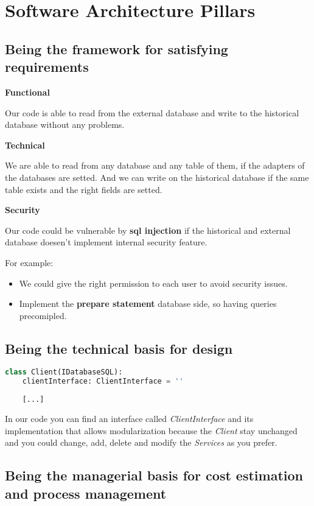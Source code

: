 \section{Software Architecture Pillars}

\subsection{Being the framework for satisfying requirements}

\textbf{Functional}

Our code is able to read from the external database and write to the historical database without any problems.

\textbf{Technical}

We are able to read from any database and any table of them, if the adapters of the databases are setted. And we can write on the historical database if the same table exists and the right fields are setted.

\textbf{Security}

Our code could be vulnerable by \textbf{sql injection} if the historical and external database doesen't implement internal security feature.

For example:
\begin{itemize}
	\item We could give the right permission to each user to avoid security issues.
	\item Implement the \textbf{prepare statement} database side, so having queries precomipled.
\end{itemize}

\subsection{Being the technical basis for design}

\begin{lstlisting}[language=Python]
class Client(IDatabaseSQL): 
	clientInterface: ClientInterface = ''
	
	[...]
\end{lstlisting}

In our code you can find an interface called \textit{ClientInterface} and its implementation that allows modularization because the \textit{Client} stay unchanged and you could change, add, delete and modify the \textit{Services} as you prefer.

\subsection{Being the managerial basis for cost estimation and process management}


